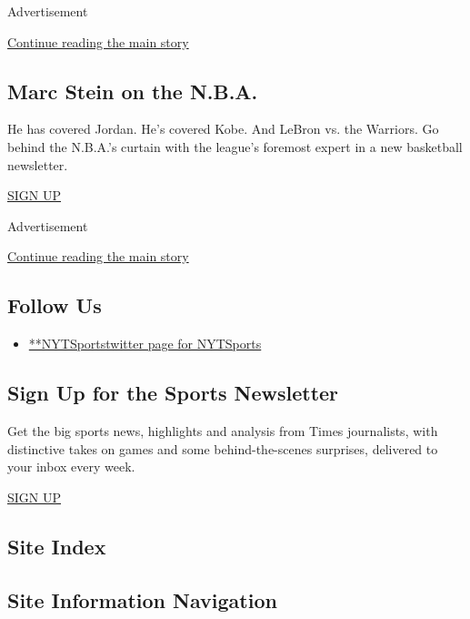 Advertisement

\protect\hyperlink{after-mid2}{Continue reading the main story}

\hypertarget{marc-stein-on-the-nba}{%
\subsection{Marc Stein on the N.B.A.}\label{marc-stein-on-the-nba}}

He has covered Jordan. He's covered Kobe. And LeBron vs. the Warriors.
Go behind the N.B.A.'s curtain with the league's foremost expert in a
new basketball newsletter.

\href{/newsletters/signup/MSB}{SIGN UP}

Advertisement

\protect\hyperlink{after-mktg}{Continue reading the main story}

\hypertarget{follow-us}{%
\subsection{Follow Us}\label{follow-us}}

\begin{itemize}
\tightlist
\item
  \href{https://twitter.com/NYTSports}{**NYTSportstwitter page for
  NYTSports}
\end{itemize}

\hypertarget{sign-up-for-the-sports-newsletter}{%
\subsection{Sign Up for the Sports
Newsletter}\label{sign-up-for-the-sports-newsletter}}

Get the big sports news, highlights and analysis from Times journalists,
with distinctive takes on games and some behind-the-scenes surprises,
delivered to your inbox every week.

\href{/newsletters/signup/SP}{SIGN UP}

\hypertarget{site-index}{%
\subsection{Site Index}\label{site-index}}

\hypertarget{site-information-navigation}{%
\subsection{Site Information
Navigation}\label{site-information-navigation}}

